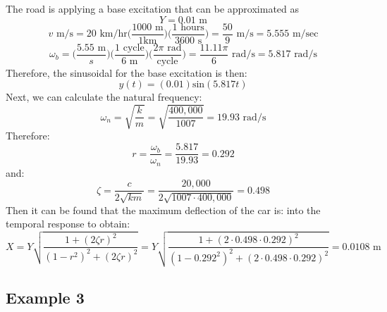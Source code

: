 \documentclass[12pt,a4paper]{article}
\begin{document}
			The road is applying a base excitation that can be approximated as 
			\begin{equation}
				Y = 0.01 \text{ m}
			\end{equation} 				
			\begin{equation}
				v \text{ m/s} = 20 \text{ km/hr}\Bigg(\frac{1000 \text{ m}}{1 \text {km}}\Bigg) \Bigg(\frac{1 \text{ hours}}{3600 \text { s}}\Bigg) = \frac{50}{9} \text{ m/s} = 5.555 \text{ m/sec}
			\end{equation} 	
			\begin{equation}
				\omega_b = \Bigg(\frac{ 5.55 \text{ m}}{s}\Bigg) \Bigg(\frac{ 1 \text{ cycle}}{6 \text{ m}}\Bigg) \Bigg(\frac{ 2 \pi \text{ rad}}{\text {cycle}}\Bigg) = \frac{ 11.11 \pi }{6 } \text{ rad/s} =5.817 \text{ rad/s} 
			\end{equation} 	
			Therefore, the sinusoidal for the base excitation is then:
			\begin{equation}
				y(t) = (0.01) \text{sin}(5.817 t)
			\end{equation} 	
			Next, we can calculate the natural frequency:
			\begin{equation}
				\omega_n = \sqrt{\frac{k}{m}} = \sqrt{\frac{400,000}{1007}} = 19.93 \text{ rad/s}
			\end{equation} 			
			Therefore:
			\begin{equation}
			r=\frac{\omega_b}{\omega_n} = \frac{5.817}{19.93} =0.292
			\end{equation} 		
			and:
			\begin{equation}
			\zeta = \frac{c}{2\sqrt{km}}= \frac{20,000}{2\sqrt{1007\cdot400,000}} = 0.498
			\end{equation}	
			Then it can be found that the maximum deflection of the car is:
			into the temporal response to obtain:
			\begin{equation}
			X = Y \sqrt{\frac{1+(2 \zeta r)^2}{(1-r^2)^2 + (2 \zeta r )^2}} = Y \sqrt{\frac{1+(2 \cdot 0.498 \cdot 0.292)^2}{(1-0.292^2)^2 + (2 \cdot 0.498 \cdot 0.292 )^2}}  = 0.0108 \text{ m}
			\end{equation} 		
			
			
		\subsection*{Example 3}
	
\end{document}
